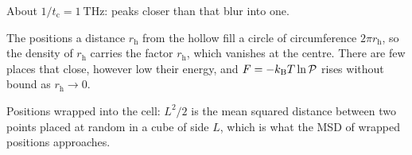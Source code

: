 About $1/t_{\mathrm c} = \SI{1}{\tera\hertz}$: peaks
closer than that blur into one.

The positions a distance $r_{\mathrm h}$ from the hollow fill a
circle of circumference $2\pi r_{\mathrm h}$, so the density of $r_{\mathrm h}$ carries the factor
$r_{\mathrm h}$, which vanishes at the centre. There are few places that close,
however low their energy, and $F = -k_{\mathrm{B}} T\ln\mathcal{P}$ rises without
bound as $r_{\mathrm h} \to 0$.

Positions wrapped into the cell: $L^2/2$ is
the mean squared distance between two points placed at random in a cube
of side $L$, which is what the MSD of wrapped positions approaches.
